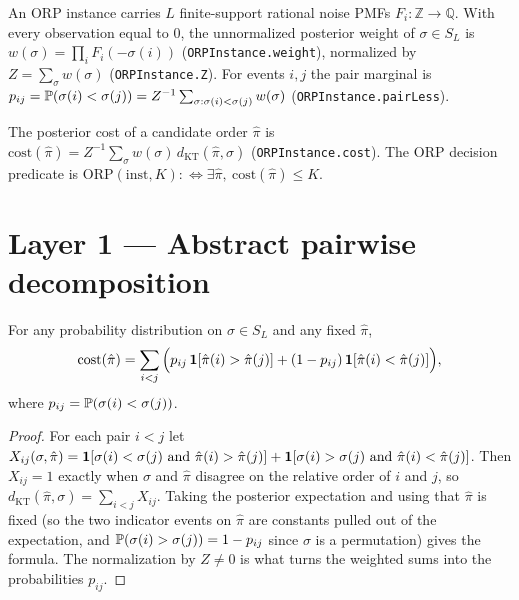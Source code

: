 \begin{definition}
\label{def:posterior}
\leanok
An ORP instance carries $L$ finite-support rational noise PMFs
$F_i : \mathbb{Z} \to \mathbb{Q}$. With every observation equal to $0$, the
unnormalized posterior weight of $\sigma \in S_L$ is
$w(\sigma) = \prod_{i} F_i(-\sigma(i))$ (\texttt{ORPInstance.weight}), normalized
by $Z = \sum_\sigma w(\sigma)$ (\texttt{ORPInstance.Z}). For events $i,j$ the
pair marginal is
$p_{ij} = \mathbb{P}(\sigma(i) < \sigma(j)) = Z^{-1}\sum_{\sigma : \sigma(i) < \sigma(j)}
w(\sigma)$ (\texttt{ORPInstance.pairLess}).
\end{definition}

\begin{definition}
\label{def:orp}
\leanok
{}
The posterior cost of a candidate order $\hat\pi$ is
$\mathrm{cost}(\hat\pi) = Z^{-1}\sum_\sigma w(\sigma)\,d_{\mathrm{KT}}(\hat\pi,\sigma)$
(\texttt{ORPInstance.cost}). The ORP decision predicate is
$\mathrm{ORP}(\mathrm{inst},K) :\Leftrightarrow \exists \hat\pi,\
\mathrm{cost}(\hat\pi) \le K$.
\end{definition}

\section{Layer 1 --- Abstract pairwise decomposition}

\begin{lemma}
\label{lem:pairwise_decomp}
\leanok
{}
For any probability distribution on $\sigma \in S_L$ and any fixed $\hat\pi$,
\[
  \mathrm{cost}(\hat\pi) = \sum_{i<j}
  \Big( p_{ij}\,\mathbf{1}[\hat\pi(i) > \hat\pi(j)] +
        (1-p_{ij})\,\mathbf{1}[\hat\pi(i) < \hat\pi(j)] \Big),
\]
where $p_{ij} = \mathbb{P}(\sigma(i) < \sigma(j))$.
\end{lemma}
\begin{proof}
\leanok
For each pair $i<j$ let
$X_{ij}(\sigma,\hat\pi) = \mathbf{1}[\sigma(i)<\sigma(j) \text{ and } \hat\pi(i)>\hat\pi(j)]
+ \mathbf{1}[\sigma(i)>\sigma(j) \text{ and } \hat\pi(i)<\hat\pi(j)]$.
Then $X_{ij} = 1$ exactly when $\sigma$ and $\hat\pi$ disagree on the relative
order of $i$ and $j$, so $d_{\mathrm{KT}}(\hat\pi,\sigma) = \sum_{i<j} X_{ij}$.
Taking the posterior expectation and using that $\hat\pi$ is fixed (so the two
indicator events on $\hat\pi$ are constants pulled out of the expectation, and
$\mathbb{P}(\sigma(i)>\sigma(j)) = 1 - p_{ij}$ since $\sigma$ is a permutation) gives
the formula. The normalization by $Z \ne 0$ is what turns the weighted sums into
the probabilities $p_{ij}$.
\end{proof}


